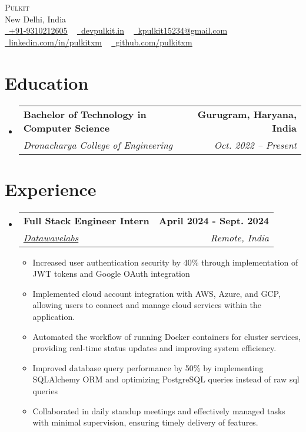 \documentclass[letterpaper,11pt]{article}
\makeatletter
\newcommand{\resumeItem}[1]{
  \item{
    {#1 \vspace{-2pt}}
  }
}
\newcommand{\resumeSubheading}[4]{
  \vspace{-2pt}\item
    \begin{tabular*}{1.0\textwidth}[t]{l@{\extracolsep{\fill}}r}
      \textbf{#1} & \textbf{ #2} \\
      \textit{#3} & \textit{ #4} \\
    \end{tabular*}\vspace{-7pt}
}
\newcommand{\resumeSubHeadingListStart}{\begin{itemize}[leftmargin=0.0in, label={}]}
\newcommand{\resumeSubHeadingListEnd}{\end{itemize}}
\newcommand{\resumeItemListStart}{\begin{itemize}}
\newcommand{\resumeItemListEnd}{\end{itemize}\vspace{-5pt}}
\makeatother
\begin{document}
\begin{center}
    {\Huge \scshape Pulkit} \\ \vspace{3pt}
    New Delhi, India \\ \vspace{3pt}
    \small 
    \href{tel:+919310212605}{\raisebox{-0.1\height}\faPhone\ \underline{+91-9310212605}} ~
    \href{https://www.devpulkit.in/}{\raisebox{-0.2\height}\faLink\ \underline{devpulkit.in}} ~
    \href{mailto:kpulkit15234@gmail.com}{\raisebox{-0.2\height}\faEnvelope\ \underline{kpulkit15234@gmail.com}} ~
    \href{https://www.linkedin.com/in/pulkitxm}{\raisebox{-0.2\height}\faLinkedin\ \underline{linkedin.com/in/pulkitxm}} ~
    \href{https://github.com/Pulkitxm}{\raisebox{-0.2\height}\faGithub\ \underline{github.com/pulkitxm}}
    \vspace{-8pt}
\end{center}

\section{Education}
\resumeSubHeadingListStart%
\resumeSubheading%
{Bachelor of Technology in Computer Science}{Gurugram, Haryana, India}
{Dronacharya College of Engineering}{Oct. 2022 – Present}
\resumeSubHeadingListEnd%

\section{Experience}
\resumeSubHeadingListStart%
\resumeSubheading%
{Full Stack Engineer Intern}{April 2024 - Sept. 2024}
{\href{https://www.datawavelabs.io/}{Datawavelabs}}{Remote, India}
\resumeItemListStart%
\resumeItem{Increased user authentication security by 40\% through implementation of JWT tokens and Google OAuth integration}
\resumeItem{Implemented cloud account integration with AWS, Azure, and GCP, allowing users to connect and manage cloud services within the application.}
\resumeItem{Automated the workflow of running Docker containers for cluster services, providing real-time status updates and improving system efficiency.}
\resumeItem{Improved database query performance by 50\% by implementing SQLAlchemy ORM and optimizing PostgreSQL queries instead of raw sql queries}
\resumeItem{Collaborated in daily standup meetings and effectively managed tasks with minimal supervision, ensuring timely delivery of features.}
\resumeItemListEnd%
\resumeSubHeadingListEnd%
\vspace{-14pt}
\end{document}
